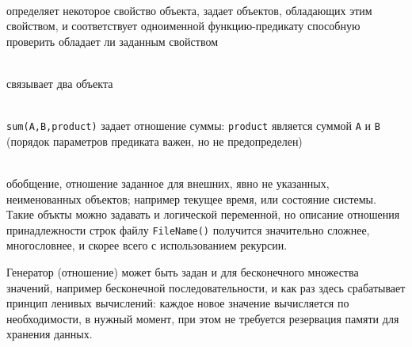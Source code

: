 \begin{description}[nosep]
\item[унарное отношение] \\
определяет некоторое свойство объекта, задает  объектов,
обладающих этим свойством, и соответствует одноименной функцию-предикату
способную проверить обладает ли  заданным свойством 
\item[бинарное отношение] \\
связывает два объекта
\item[n-арное отношение] \\
\verb|sum(A,B,product)| задает  отношение суммы: \verb|product|
является суммой \verb|A| и \verb|B| (порядок параметров предиката важен, но не
предопределен)
\item[нуль-арное отношение] \\
обобщение, отношение заданное для внешних, явно не указанных, неименованных
объектов; например текущее время, или состояние системы. Такие объкты можно
задавать и логической переменной, но описание отношения принадлежности строк
файлу \verb|FileName()| получится значительно сложнее, многословнее, и скорее
всего с использованием рекурсии.
\end{description}

\bigskip
Генератор (отношение) может быть задан и для бесконечного множества значений,
например бесконечной последовательности, и как раз здесь срабатывает принцип
ленивых вычислений: каждое новое значение вычисляется по необходимости, в нужный
момент, при этом не требуется резервация памяти для хранения данных.

\medskip
{}
